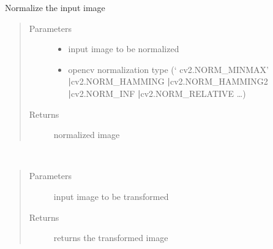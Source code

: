 \documentclass[letterpaper,10pt,english]{sphinxmanual}
\begin{document}
\begin{fulllineitems}
\label{\detokenize{ida_lib.operations:ida_lib.operations.pixel_ops_functional.normalize_image}}
Normalize the input image
\begin{quote}\begin{description}
\item[{Parameters}] \leavevmode\begin{itemize}
\item {} 
 \textendash{} input image to be normalized

\item {} 
 \textendash{} opencv normalization type (‘ cv2.NORM\_MINMAX’ {\color{red}\bfseries{}|}cv2.NORM\_HAMMING {\color{red}\bfseries{}|}cv2.NORM\_HAMMING2
{\color{red}\bfseries{}|}cv2.NORM\_INF {\color{red}\bfseries{}|}cv2.NORM\_RELATIVE …)

\end{itemize}

\item[{Returns}] \leavevmode
normalized image

\end{description}\end{quote}

\end{fulllineitems}


\begin{fulllineitems}
\label{\detokenize{ida_lib.operations:ida_lib.operations.pixel_ops_functional.poisson_noise}}~\begin{quote}\begin{description}
\item[{Parameters}] \leavevmode
{} \textendash{} input image to be transformed

\item[{Returns}] \leavevmode
returns the transformed image

\end{description}\end{quote}

\end{fulllineitems}
\end{document}
